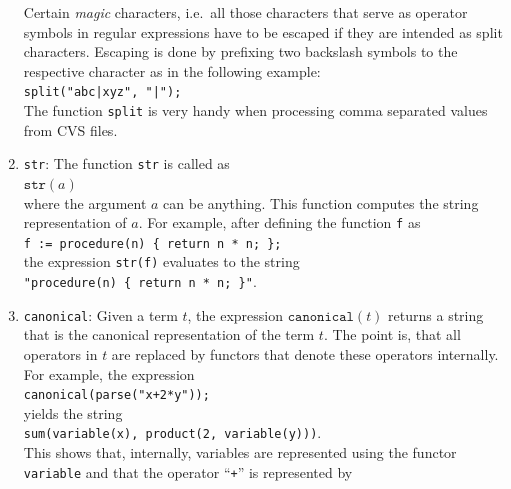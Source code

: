 \documentclass[11pt]{report}
\begin{document}
\begin{enumerate}
      Certain \emph{magic} characters, i.e.~all those characters that serve as operator
      symbols in regular expressions have to be escaped if they are intended as split
      characters.  Escaping is done by prefixing two backslash symbols to the respective 
      character as in the following example:
      \\[0.2cm]
      \hspace*{1.3cm}
      \texttt{split("abc|xyz", "|");}
      \\[0.2cm]
      The function \texttt{split} is very handy when processing comma separated values from
      \textsc{CVS} files.
\item \texttt{str}:  The function \texttt{str} is called as
      \\[0.2cm]
      \hspace*{1.3cm}
      $\texttt{str}(a)$
      \\[0.2cm]
      where the argument $a$ can be anything.  This function computes the string
      representation of $a$.  For example, after defining the function \texttt{f} as
      \\[0.2cm]
      \hspace*{1.3cm}
      \texttt{f := procedure(n) \{ return n * n; \};}
      \\[0.2cm]
      the expression \texttt{str(f)} evaluates to the string
      \\[0.2cm]
      \hspace*{1.3cm}
      \texttt{"procedure(n) \{ return n * n; \}"}.
\item \texttt{canonical}:  Given a term $t$, the expression $\mathtt{canonical}(t)$
      returns a string that is the canonical representation of the term $t$.  The 
      point is, that all operators in $t$ are replaced by functors that denote
      these operators internally.  For example, the expression
      \\[0.2cm]
      \hspace*{1.3cm}
      \texttt{canonical(parse("x+2*y"));}
      \\[0.2cm]
      yields the string
      \\[0.2cm]
      \hspace*{1.3cm}
      \texttt{sum(variable(x), product(2, variable(y)))}.
      \\[0.2cm]
      This shows that, internally, variables are represented using the functor
      \texttt{variable} and that the operator ``\texttt{+}'' is represented by

\end{enumerate}
\end{document}
